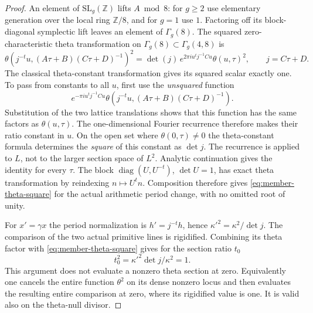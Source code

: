 \begin{proof}
An element of $\mathrm{SL}_g(\mathbb Z)$ lifts $A\bmod8$:
for $g\ge2$ use elementary generation over the local ring
$\mathbb Z/8$, and for $g=1$ use $1$.  Factoring off its
block-diagonal symplectic lift leaves an element of
$\Gamma_g(8)$.  The squared zero-characteristic theta
transformation on $\Gamma_g(8)\subset\Gamma_g(4,8)$ is
\begin{equation}\label{eq:member-theta-square}
 \theta(j^{-t}u,(A\tau+B)(C\tau+D)^{-1})^2
       =\det(j)\,e^{2\pi i u^tj^{-1}Cu}\theta(u,\tau)^2,
       \qquad j=C\tau+D.
\end{equation}
The classical theta-constant transformation gives its squared
scalar exactly one\cite{member-theta-transformation}.  To pass
from constants to all $u$, first use the \emph{unsquared} function
\[
 e^{-\pi i u^tj^{-1}Cu}
       \theta(j^{-t}u,(A\tau+B)(C\tau+D)^{-1}).
\]
Substitution of the two lattice translations shows that this
function has the same factors as $\theta(u,\tau)$.  The
one-dimensional Fourier recurrence therefore makes their ratio
constant in $u$.  On the open set where $\theta(0,\tau)\ne0$ the
theta-constant formula determines the \emph{square} of this
constant as $\det j$.  The recurrence is applied to $L$,
not to the larger section space of $L^2$.
Analytic continuation gives
the identity for every $\tau$.  The block
$\operatorname{diag}(U,U^{-t})$, $\det U=1$, has exact theta
transformation by reindexing $n\mapsto U^tn$.  Composition
therefore gives \eqref{eq:member-theta-square} for the actual
arithmetic period change, with no omitted root of unity.

For $x'=\gamma x$ the period normalization is
$h'=j^{-t}h$, hence
$\kappa'^2=\kappa^2/\det j$.  The comparison of the two
actual primitive lines is rigidified.  Combining its theta
factor with \eqref{eq:member-theta-square} gives for the
section ratio $t_0$
\[
                          t_0^2
                          =\kappa'^2\det j/\kappa^2=1.
\]
This argument does not evaluate a nonzero theta section at
zero.  Equivalently one cancels the entire function $\theta^2$
on its dense nonzero locus and then evaluates the resulting
entire comparison at zero, where its rigidified value is one.
It is valid also on the theta-null divisor.


\end{proof}
